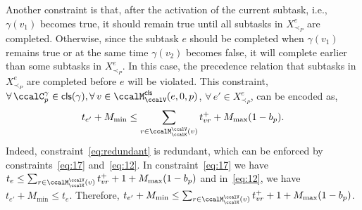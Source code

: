 \documentclass[Afour,sageh,times]{sagej}
\newcommand{\clause}[1]{\mathsf{cls}(#1)}
\begin{document}
{{{Another constraint is that, after the activation of the current subtask, i.e., $\gamma(v_1)$ becomes true, it should remain true until all subtasks in $X^e_{\prec_P}$ are completed. Otherwise, since the subtask $e$ should be completed when $\gamma(v_1)$ remains true or at the same time  $\gamma(v_2)$ becomes false, it will complete earlier than some subtasks in $X^e_{\prec_P}$. In this case, the precedence relation that subtasks in $X^e_{\prec_P}$ are completed before $e$ will be violated. This constraint, $\forall \, \ccalC_p^{\gamma} \in \clause{\gamma} , \forall \,v \in \ccalM^\mathsf{cls}_\ccalV(e,0,p)$,  $\forall\, e' \in X^e_{\prec_P}$,  can be encoded as,
\begingroup\makeatletter\def\f@size{10}\check@mathfonts
\def\maketag@@@#1{\hbox{\m@th\normalsize\normalfont#1}}%
\begin{align}\label{eq:redundant}
   t_{e'} + M_{\text{min}}   \leq  \sum_{r\in \ccalM^\ccalV_{\ccalK}(v)} t_{vr}^+   + M_{\text{max}}(1 - b_p).
\end{align}
\endgroup
Indeed, constraint~\eqref{eq:redundant} is redundant, which can be enforced by constraints~\eqref{eq:17} and~\eqref{eq:12}. In constraint~\eqref{eq:17} we have $t_e \leq    \sum_{r\in \ccalM^\ccalV_{\ccalK}(v)} t_{vr}^+ + 1 + M_{\text{max}} (1 - b_{p})$ and in~\eqref{eq:12}, we have $ t_{e'} +  M_{\text{min}}  \leq t_e$. Therefore, $t_{e'} +  M_{\text{min}} \leq  \sum_{r\in \ccalM^\ccalV_{\ccalK}(v)} t_{vr}^+  + 1 + M_{\text{max}} (1 - b_{p})$.


}}}
\end{document}
